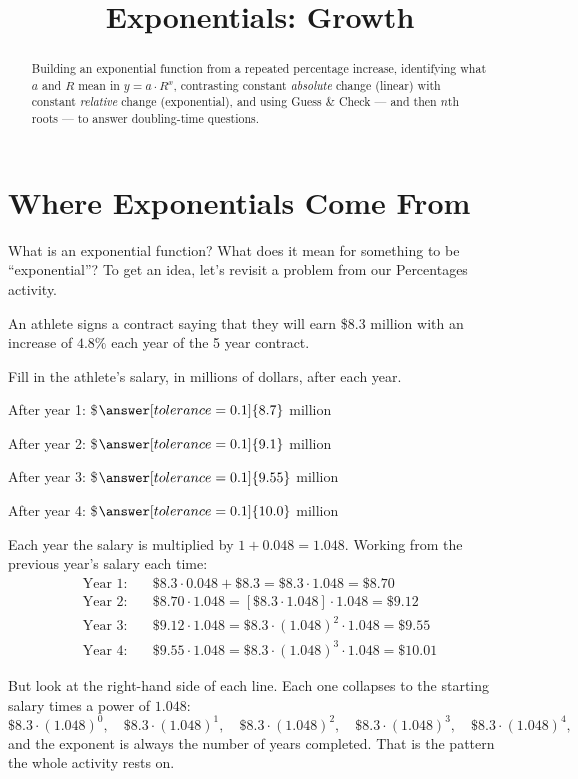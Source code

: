 \documentclass[12pt]{ximera}
\title{Exponentials: Growth}
\begin{document}
\begin{abstract}
Building an exponential function from a repeated percentage increase, identifying what
$a$ and $R$ mean in $y = a \cdot R^x$, contrasting constant \emph{absolute} change
(linear) with constant \emph{relative} change (exponential), and using Guess \& Check ---
and then $n$th roots --- to answer doubling-time questions.
\end{abstract}
\maketitle

\section*{Where Exponentials Come From}

What is an exponential function? What does it mean for something to be ``exponential''?
To get an idea, let's revisit a problem from our Percentages activity.

An athlete signs a contract saying that they will earn \$8.3 million with an increase of
$4.8\%$ each year of the 5 year contract.

\begin{problem}
Fill in the athlete's salary, in millions of dollars, after each year.

After year 1: \$$\answer[tolerance=0.1]{8.7}$ million

After year 2: \$$\answer[tolerance=0.1]{9.1}$ million

After year 3: \$$\answer[tolerance=0.1]{9.55}$ million

After year 4: \$$\answer[tolerance=0.1]{10.0}$ million

\begin{solution}
Each year the salary is multiplied by $1 + 0.048 = 1.048$. Working from the previous
year's salary each time:
\begin{align*}
\text{Year 1:} \quad & \$8.3 \cdot 0.048 + \$8.3 = \$8.3 \cdot 1.048 = \$8.70 \\
\text{Year 2:} \quad & \$8.70 \cdot 1.048 = [\$8.3 \cdot 1.048] \cdot 1.048 = \$9.12 \\
\text{Year 3:} \quad & \$9.12 \cdot 1.048 = \$8.3 \cdot (1.048)^2 \cdot 1.048 = \$9.55 \\
\text{Year 4:} \quad & \$9.55 \cdot 1.048 = \$8.3 \cdot (1.048)^3 \cdot 1.048 = \$10.01
\end{align*}

But look at the right-hand side of each line. Each one collapses to the starting salary
times a power of $1.048$:
\[
\$8.3 \cdot (1.048)^0, \quad \$8.3 \cdot (1.048)^1, \quad \$8.3 \cdot (1.048)^2,
\quad \$8.3 \cdot (1.048)^3, \quad \$8.3 \cdot (1.048)^4,
\]
and the exponent is always the number of years completed. That is the pattern the whole
activity rests on.
\end{solution}
\end{problem}
\end{document}
